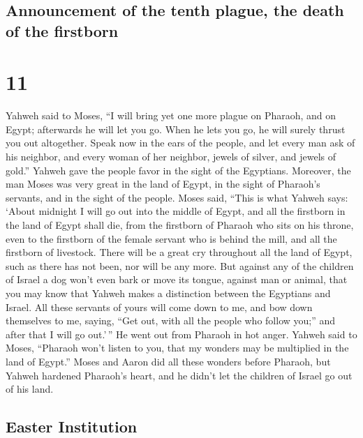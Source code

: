 \hypertarget{announcement-of-the-tenth-plague-the-death-of-the-firstborn}{%
\subsection{Announcement of the tenth plague, the death of the
firstborn}\label{announcement-of-the-tenth-plague-the-death-of-the-firstborn}}

\hypertarget{section-10}{%
\section{11}\label{section-10}}

 Yahweh said to Moses, ``I will bring yet one more plague
on Pharaoh, and on Egypt; afterwards he will let you go. When he lets
you go, he will surely thrust you out altogether.  Speak
now in the ears of the people, and let every man ask of his neighbor,
and every woman of her neighbor, jewels of silver, and jewels of gold.''
 Yahweh gave the people favor in the sight of the
Egyptians. Moreover, the man Moses was very great in the land of Egypt,
in the sight of Pharaoh's servants, and in the sight of the people.
 Moses said, ``This is what Yahweh says: `About midnight I
will go out into the middle of Egypt,  and all the
firstborn in the land of Egypt shall die, from the firstborn of Pharaoh
who sits on his throne, even to the firstborn of the female servant who
is behind the mill, and all the firstborn of livestock. 
There will be a great cry throughout all the land of Egypt, such as
there has not been, nor will be any more.  But against any
of the children of Israel a dog won't even bark or move its tongue,
against man or animal, that you may know that Yahweh makes a distinction
between the Egyptians and Israel.  All these servants of
yours will come down to me, and bow down themselves to me, saying, ``Get
out, with all the people who follow you;'' and after that I will go
out.'\,'' He went out from Pharaoh in hot anger.  Yahweh
said to Moses, ``Pharaoh won't listen to you, that my wonders may be
multiplied in the land of Egypt.''  Moses and Aaron did
all these wonders before Pharaoh, but Yahweh hardened Pharaoh's heart,
and he didn't let the children of Israel go out of his land.

\hypertarget{easter-institution}{%
\subsection{Easter Institution}\label{easter-institution}}

